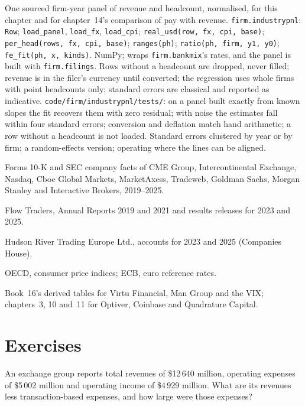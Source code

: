 \begin{build}
 One sourced firm-year panel of revenue and headcount, normalised, for this chapter and for chapter~14's
comparison of pay with revenue.
 \texttt{firm.industrypnl}: \texttt{Row}; \texttt{load\_panel}, \texttt{load\_fx},
\texttt{load\_cpi}; \texttt{real\_usd(row, fx, cpi, base)}; \texttt{per\_head(rows, fx, cpi, base)};
\texttt{ranges(ph)}; \texttt{ratio(ph, firm, y1, y0)}; \texttt{fe\_fit(ph, x, kinds)}. NumPy; wraps
\texttt{firm.bankmix}'s rates, and the panel is built with \texttt{firm.filings}.
 Rows without a headcount are dropped, never filled; revenue is in the filer's currency until converted;
the regression uses whole firms with point headcounts only; standard errors are classical and reported as indicative.
 \texttt{code/firm/industrypnl/tests/}: on a panel built exactly from known slopes the fit
recovers them with zero residual; with noise the estimates fall within four standard errors; conversion and
deflation match hand arithmetic; a row without a headcount is not loaded.
 Standard errors clustered by year or by firm; a random-effects version; operating 
where the lines can be aligned.
\end{build}

\begin{omsources}
\item Forms 10-K and SEC company facts of CME Group, Intercontinental Exchange, Nasdaq, Cboe Global Markets,
MarketAxess, Tradeweb, Goldman Sachs, Morgan Stanley and Interactive Brokers, 2019--2025.
\item Flow Traders, Annual Reports 2019 and 2021 and results releases for 2023 and 2025.
\item Hudson River Trading Europe Ltd., accounts for 2023 and 2025 (Companies House).
\item OECD, consumer price indices; ECB, euro reference rates.
\item Book~16's derived tables for Virtu Financial, Man Group and the VIX; chapters~3, 10 and~11 for Optiver, Coinbase
and Quadrature Capital.
\end{omsources}

\section{Exercises}

\begin{exercise}[$\star$]\label{exo:in:revenue-and-profit-across-the-industry:1}
An exchange group reports total revenues of \$12\,640 million, operating expenses of \$5\,002 million and operating
income of \$4\,929 million. What are its revenues less transaction-based expenses, and how large were those expenses?
\end{exercise}

